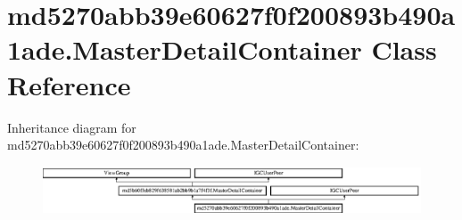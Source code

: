 \hypertarget{classmd5270abb39e60627f0f200893b490a1ade_1_1MasterDetailContainer}{}\section{md5270abb39e60627f0f200893b490a1ade.\+Master\+Detail\+Container Class Reference}
\label{classmd5270abb39e60627f0f200893b490a1ade_1_1MasterDetailContainer}
Inheritance diagram for md5270abb39e60627f0f200893b490a1ade.\+Master\+Detail\+Container\+:\begin{figure}[H]
\begin{center}
\leavevmode
\includegraphics[height=1.432225cm]{classmd5270abb39e60627f0f200893b490a1ade_1_1MasterDetailContainer}
\end{center}
\end{figure}
